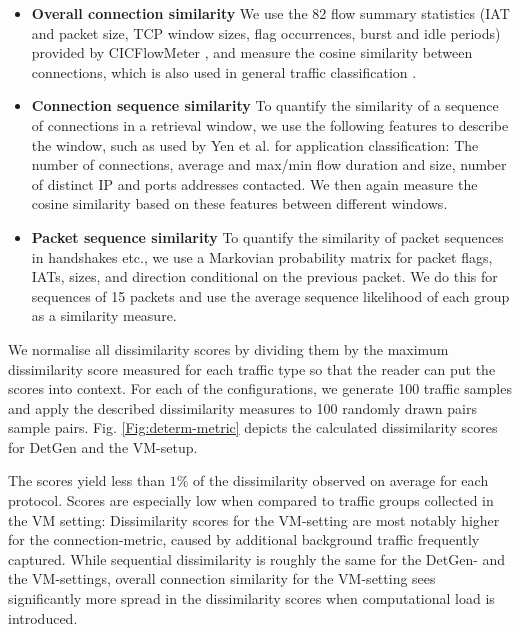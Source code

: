 \documentclass[runningheads]{llncs}
\begin{document}
\begin{itemize}
\item \textbf{Overall connection similarity} We use the 82 flow summary statistics (IAT and packet size, TCP window sizes, flag occurrences, burst and idle periods) provided by CICFlowMeter \cite{lashkari2017characterization}, and measure the cosine similarity between connections, which is also used in general traffic classification \cite{aun2017review}.
\item \textbf{Connection sequence similarity} 
To quantify the similarity of a sequence of connections in a retrieval window, we use the following features to describe the window, such as used by Yen et al. \cite{yen2009browser} for application classification: The number of connections, average and max/min flow duration and size, number of distinct IP and ports addresses contacted. We then again measure the cosine similarity based on these features between different windows. 
\item \textbf{Packet sequence similarity} To quantify the similarity of packet sequences in handshakes etc., we use a Markovian probability matrix for packet flags, IATs, sizes, and direction conditional on the previous packet. We do this for sequences of 15 packets and use the average sequence likelihood of each group as a similarity measure. %
\end{itemize}

We normalise all dissimilarity scores by dividing them by the maximum dissimilarity score measured for each traffic type so that the reader can put the scores into context.
For each of the configurations, we generate 100 traffic samples and apply the described dissimilarity measures to 100 randomly drawn pairs sample pairs. Fig. \ref{Fig:determ-metric} depicts the calculated dissimilarity scores for DetGen and the VM-setup.%

The scores yield less than $1\%$ of the dissimilarity observed on average for each protocol. Scores are especially low when compared to traffic groups collected in the VM setting: Dissimilarity scores for the VM-setting are most notably higher for the connection-metric, caused by additional background traffic frequently captured. While sequential dissimilarity is roughly the same for the DetGen- and the VM-settings, overall connection similarity for the VM-setting sees significantly more spread in the dissimilarity scores when computational load is introduced.
\end{document}
